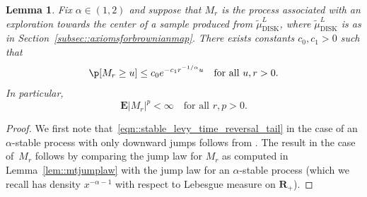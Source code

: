 \documentclass[10pt]{amsart}
\theoremstyle{plain}
\numberwithin{theorem}{section}
\newtheorem{lemma}[theorem]{Lemma}
\theoremstyle{definition}
\newcommand \E {{\mathbf E}}
\newcommand{\R}{\mathbf{R}}
\newcommand{\tmudl}{\wt{\mu}_{\mathrm{DISK}}^L}
\let\wt\widetilde
\begin{document}
\begin{lemma}
\label{lem::stable_levy_time_reversal}
Fix $\alpha \in (1,2)$ and suppose that $M_r$ is the process associated with an exploration towards the center of a sample produced from $\tmudl$, where $\tmudl$ is as in Section~\ref{subsec::axiomsforbrownianmap}. There exists constants $c_0,c_1 > 0$ such that
\begin{equation}
\label{eqn::stable_levy_time_reversal_tail}
\p[ M_r \geq u ] \leq c_0 e^{-c_1 r^{-1/\alpha} u} \quad\text{for all } u,r > 0.
\end{equation}
In particular,
\begin{equation}
\label{eqn::stable_levy_time_reversal_moment}
\E |M_r|^p < \infty \quad\text{for all } r,p > 0.
\end{equation}
\end{lemma}
\begin{proof}
We first note that~\eqref{eqn::stable_levy_time_reversal_tail} in the case of an $\alpha$-stable process with only downward jumps follows from \cite[Chap.\,VII, Cor.\,2]{bertoinlevybook}. The result in the case of~$M_r$ follows by comparing the jump law for $M_r$ as computed in Lemma~\ref{lem::mtjumplaw} with the jump law for an $\alpha$-stable process (which we recall has density $x^{-\alpha-1}$ with respect to Lebesgue measure on $\R_+$).
\end{proof}
\end{document}
